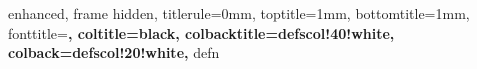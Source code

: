 {
  enhanced,
  frame hidden,
  titlerule=0mm,
  toptitle=1mm,
  bottomtitle=1mm,
  fonttitle=\bfseries\large,
  coltitle=black,
  colbacktitle=defscol!40!white,
  colback=defscol!20!white,
}{defn}







